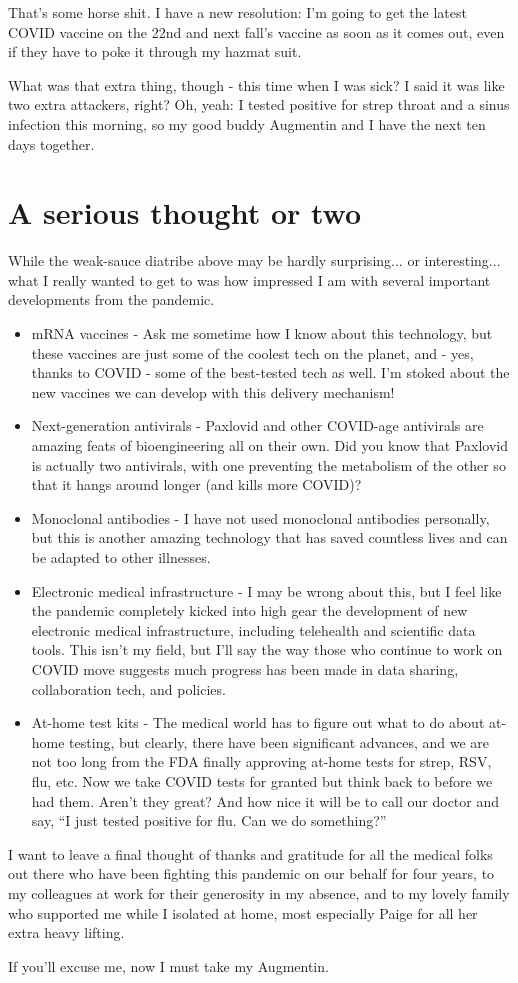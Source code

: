 \documentclass{article}
\begin{document}
That's some horse shit. I have a new resolution: I'm going to get the latest COVID vaccine on the 22nd and next fall's vaccine as soon as it comes out, even if they have to poke it through my hazmat suit.

What was that extra thing, though - this time when I was sick? I said it was like two extra attackers, right? Oh, yeah: I tested positive for strep throat and a sinus infection this morning, so my good buddy Augmentin and I have the next ten days together.

\section{A serious thought or two}

While the weak-sauce diatribe above may be hardly surprising... or interesting... what I really wanted to get to was how impressed I am with several important developments from the pandemic.
\begin{itemize}
\item mRNA vaccines - Ask me sometime how I know about this technology, but these vaccines are just some of the coolest tech on the planet, and - yes, thanks to COVID - some of the best-tested tech as well. I'm stoked about the new vaccines we can develop with this delivery mechanism!
\item Next-generation antivirals - Paxlovid and other COVID-age antivirals are amazing feats of bioengineering all on their own. Did you know that Paxlovid is actually two antivirals, with one preventing the metabolism of the other so that it hangs around longer (and kills more COVID)?
\item Monoclonal antibodies - I have not used monoclonal antibodies personally, but this is another amazing technology that has saved countless lives and can be adapted to other illnesses.
\item Electronic medical infrastructure - I may be wrong about this, but I feel like the pandemic completely kicked into high gear the development of new electronic medical infrastructure, including telehealth and scientific data tools. This isn't my field, but I'll say the way those who continue to work on COVID move suggests much progress has been made in data sharing, collaboration tech, and policies.
\item At-home test kits - The medical world has to figure out what to do about at-home testing, but clearly, there have been significant advances, and we are not too long from the FDA finally approving at-home tests for strep, RSV, flu, etc. Now we take COVID tests for granted but think back to before we had them. Aren't they great? And how nice it will be to call our doctor and say, ``I just tested positive for flu. Can we do something?''
\end{itemize}

I want to leave a final thought of thanks and gratitude for all the medical folks out there who have been fighting this pandemic on our behalf for four years, to my colleagues at work for their generosity in my absence, and to my lovely family who supported me while I isolated at home, most especially Paige for all her extra heavy lifting.

If you'll excuse me, now I must take my Augmentin. 
\end{document}
